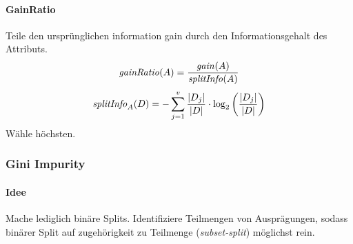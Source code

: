 \documentclass[10pt]{article} %
\DeclarePairedDelimiter\abs{\lvert}{\rvert}%
\begin{document}
\paragraph{GainRatio}
\newcommand{\gainratio}{\text{\textit{gainRatio}}}
\newcommand{\splitinfo}{\text{\textit{splitInfo}}}
Teile den ursprünglichen information gain durch den Informationsgehalt des Attributs.
$$
   \gainratio(A) = \frac{\gain(A)}{\splitinfo(A)}
$$
$$
   \splitinfo_A(D) = - \sum_{j=1}^{v} \frac{\abs{D_j}}{\abs{D}} \cdot \log_2 \left(\frac{\abs{D_j}}{\abs{D}} \right)
$$
Wähle höchsten.





\subsubsection{Gini Impurity}
\newcommand{\gini}{\text{\textit{gini}}}

\paragraph{Idee} Mache lediglich binäre Splits. Identifiziere Teilmengen von
Ausprägungen, sodass binärer Split auf zugehörigkeit zu Teilmenge
(\textit{subset-split}) möglichst rein.



\end{document}
